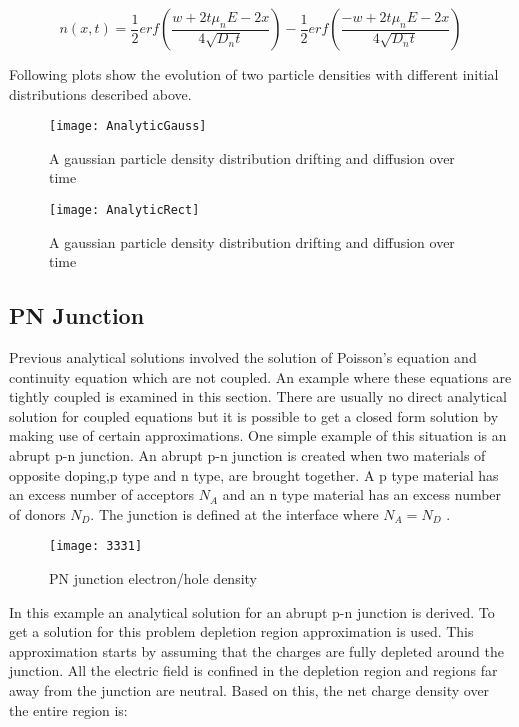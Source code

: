 \begin{doublespace}
\begin{equation}
n(x,t)=\frac{1}{2} erf(\frac{w+2t \mu_n E-2x}{4\sqrt{D_n t}})-\frac{1}{2}erf(\frac{-w+2t \mu_n E-2x}{4\sqrt{D_n t}}) 
\end{equation}

Following plots show the evolution of two particle densities with different initial distributions described above.

\begin{figure}[!htp]
\centering
\texttt{[image: AnalyticGauss]}
\caption{A gaussian particle density distribution drifting and diffusion over time} 
\end{figure}

\begin{figure}[!htp]
\centering
\texttt{[image: AnalyticRect]}
\caption{A gaussian particle density distribution drifting and diffusion over time} 
\end{figure}
\clearpage
\subsection{PN Junction}
Previous analytical solutions involved the solution of Poisson's equation and continuity equation which are not coupled. An example where these equations are tightly coupled is examined in this section. There are usually no direct analytical solution for coupled equations but it is possible to get a closed form solution by making use of certain approximations. One simple example of this situation is an abrupt p-n junction. An abrupt p-n junction is created when two materials of opposite doping,p type and n type, are brought together. A p type material has an excess number of acceptors $N_A$ and an n type material has an excess number of donors $N_D$. The junction is defined at the interface where $N_A=N_D$ \cite{Physem}. 

\begin{figure}[!htp]
\centering
\texttt{[image: 3331]}
\caption{PN junction electron/hole density} 
\end{figure}

In this example an analytical solution for an abrupt p-n junction is derived. To get a solution for this problem depletion region approximation is used. This approximation starts by assuming that the charges are fully depleted around the junction\cite{Physem}. All the electric field is confined in the depletion region and regions far away from the junction are neutral. Based on this, the net charge density over the entire region is:


\end{doublespace}
